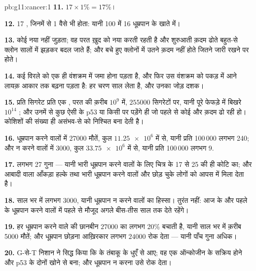 \begin{solution}{pb:g11:cancer:1}
\textbf{11.} $17 \times 1\% = 17\%$।

\textbf{12.} 17 , जिनमें से 1 वैसे भी होता: यानी 100 में 16 धूम्रपान
के खाते में।

\textbf{13.} कोई नया  नहीं जुड़ता; वह परत ख़ुद को नया करती रहती
है और शुरुआती क़दम ढोते बहुत-से क्लोन सालों में झड़कर बदल जाते हैं; और बचे
हुए क्लोनों में उतने क़दम नहीं होते जितने जारी रखने पर होते।

\textbf{14.} कई विरले  को एक ही वंशक्रम में जमा होना पड़ता
है, और फिर उस वंशक्रम को पकड़ में आने लायक़ आकार तक बढ़ना पड़ता है: हर चरण
साल लेता है, और उनका जोड़ दशक।

\textbf{15.} प्रति सिगरेट प्रति  एक , परत की क़रीब
$10^9$  में, $\num{255000}$ सिगरेटों पर, यानी पूरे फेफड़े में
बिखरे $10^{14}$ ; और उनमें से कुछ ऐसी  के p53 या किसी
 पर पड़ेंगे ही जो पहले से कोई और क़दम ढो रही हो। कोशिशों की
संख्या ही असंभव-से को निश्चित बना देती है।

\textbf{16.} धूम्रपान करने वालों में $\num{27000}$ मौतें, कुल
$\num{11.25e6}$ में से, यानी प्रति 100\,000 लगभग 240; और न करने वालों में
3000, कुल $\num{33.75e6}$ में से, यानी प्रति 100\,000 लगभग 9.

\textbf{17.} लगभग 27 गुना --- यानी भारी धूम्रपान करने वालों के लिए चित्र
के 17 से 25 की ही कोटि का; और आबादी वाला आँकड़ा हल्के तथा भारी धूम्रपान
करने वालों और छोड़ चुके लोगों को आपस में मिला देता है।

\textbf{18.} साल भर में लगभग 3000, यानी धूम्रपान न करने वालों का हिस्सा।
तुरंत नहीं: आज के और पहले के धूम्रपान करने वालों में पहले से मौजूद
 अगले बीस-तीस साल तक  देते रहेंगे।

\textbf{19.} हर धूम्रपान करने वाले की छानबीन $\num{27000}$ का लगभग 20\%
बचाती है, यानी साल भर में क़रीब 5000 मौतें; और धूम्रपान छोड़ना आख़िरकार
लगभग $\num{24000}$ रोक देता --- यानी पाँच गुना अधिक।

\textbf{20.} G-से-T निशान ने सिद्ध किया कि  के  तंबाकू के
धुएँ से आए; वह  एक ऑन्कोजीन के सक्रिय होने और p53 के दोनों 
खोने से बना; और धूम्रपान न करना उसे रोक देता।
\end{solution}

